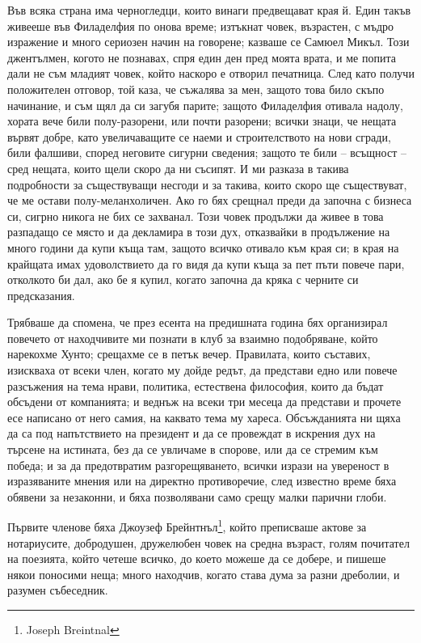 \documentclass[12pt]{book}
\begin{document}
Във всяка страна има черногледци, които винаги предвещават края й. Един такъв живееше във Филаделфия по онова време; изтъкнат човек, възрастен, с мъдро изражение и много сериозен начин на говорене; казваше се Самюел Микъл. Този джентълмен, когото не познавах, спря един ден пред моята врата, и ме попита дали не съм младият човек, който наскоро е отворил печатница. След като получи положителен отговор, той каза, че съжалява за мен, защото това било скъпо начинание, и съм щял да си загубя парите; защото Филаделфия отивала надолу, хората вече били полу-разорени, или почти разорени; всички знаци, че нещата вървят добре, като увеличаващите се наеми и строителството на нови сгради, били фалшиви, според неговите сигурни сведения; защото те били – всъщност – сред нещата, които щели скоро да ни съсипят. И ми разказа в такива подробности за съществуващи несгоди и за такива, които скоро ще съществуват, че ме остави полу-меланхоличен. Ако го бях срещнал преди да започна с бизнеса си, сигрно никога не бих се захванал. Този човек продължи да живее в това разпадащо се място и да декламира в този дух, отказвайки в продължение на много години да купи къща там, защото всичко отивало към края си; в края на крайщата имах удоволствието да го видя да купи къща за пет пъти повече пари, отколкото би дал, ако бе я купил, когато започна да кряка с черните си предсказания.

Трябваше да спомена, че през есента на предишната година бях организирал повечето от находчивите ми познати в клуб за взаимно подобряване, който нарекохме Хунто; срещахме се в петък вечер. Правилата, които съставих, изискваха от всеки член, когато му дойде редът, да представи едно или повече разсъжения на тема нрави, политика, естествена философия, които да бъдат обсъдени от компанията; и веднъж на всеки три месеца да представи и прочете есе написано от него самия, на каквато тема му хареса. Обсъжданията ни щяха да са под напътствието на президент и да се провеждат в искрения дух на търсене на истината, без да се увличаме в спорове, или да се стремим към победа; и за да предотвратим разгорещяването, всички изрази на увереност в изразяваните мнения или на директно противоречие, след известно време бяха обявени за незаконни, и бяха позволявани само срещу малки парични глоби.

Първите членове бяха Джоузеф Брейнтнъл\footnote{Joseph Breintnal}, който преписваше актове за нотариусите, добродушен, дружелюбен човек на средна възраст, голям почитател на поезията, който четеше всичко, до което можеше да се добере, и пишеше някои поносими неща; много находчив, когато става дума за разни дреболии, и разумен събеседник.
\end{document}
